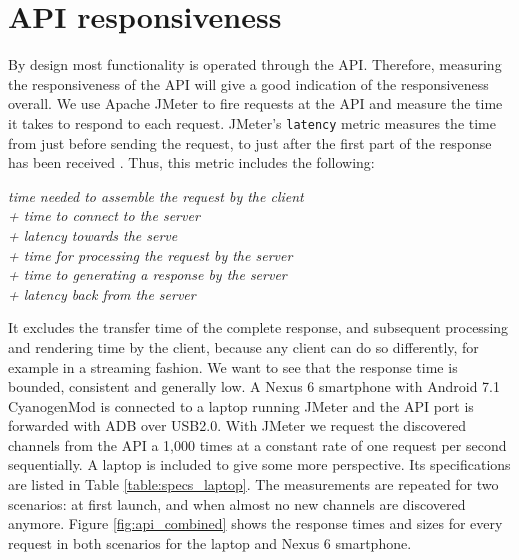 \section{API responsiveness}\label{sec:api_responsiveness}
By design most functionality is operated through the API.
Therefore, measuring the responsiveness of the API will give a good indication of the responsiveness overall.
We use Apache JMeter to fire requests at the API and measure the time it takes to respond to each request.
JMeter's \texttt{latency} metric measures the time from just before sending the request, to just after the first part of the response has been received \cite{jmeter_glossary}.
Thus, this metric includes the following:\\
\begin{minipage}{\textwidth}
\hspace{13em}
\begin{minipage}{.5\textwidth}
\emph{
	time needed to assemble the request by the client\\
	+ time to connect to the server\\
	+ latency towards the serve\\
	+ time for processing the request by the server\\
	+ time to generating a response by the server\\
	+ latency back from the server\\
}
\end{minipage}
\end{minipage}
It excludes the transfer time of the complete response, and subsequent processing and rendering time by the client, because any client can do so differently, for example in a streaming fashion.
We want to see that the response time is bounded, consistent and generally low.
A Nexus 6 smartphone with Android 7.1 CyanogenMod is connected to a laptop running JMeter and the API port is forwarded with ADB over USB2.0.
With JMeter we request the discovered channels from the API a 1,000 times at a constant rate of one request per second sequentially.
A laptop is included to give some more perspective.
Its specifications are listed in Table \ref{table:specs_laptop}.
The measurements are repeated for two scenarios: at first launch, and when almost no new channels are discovered anymore.
Figure \ref{fig:api_combined} shows the response times and sizes for every request in both scenarios for the laptop and Nexus 6 smartphone.
